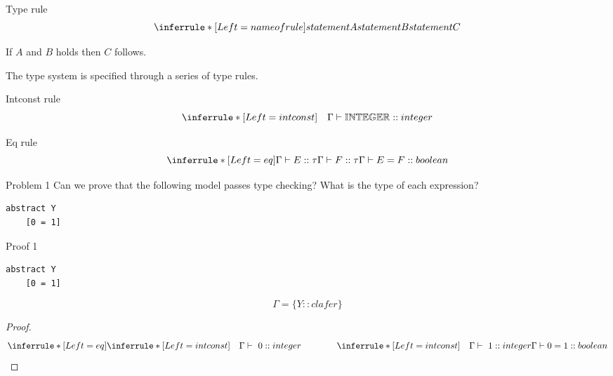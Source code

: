 \documentclass[table,15pt,t]{beamer}
\begin{document}
\begin{frame}[fragile,c]{Type rule}
\begin{equation*}
\inferrule* [Left=name of rule] {statement A \\ statement B} {statement C}
\end{equation*}

\vfill If $A$ and $B$ holds then $C$ follows.

\vfill The type system is specified through a series of type rules.
\end{frame}

\begin{frame}[fragile,c]{Intconst rule}
\begin{equation*}
\inferrule* [Left=intconst] {\quad}{\Gamma\vdash\mathbb{INTEGER}::integer}
\end{equation*}
\end{frame}

\begin{frame}[fragile,c]{Eq rule}
\begin{equation*}
\inferrule* [Left=eq] {\Gamma\vdash E::\tau \\ \Gamma\vdash F::\tau}{\Gamma\vdash E = F::boolean}
\end{equation*}
\end{frame}

\begin{frame}[fragile,c]{Problem 1}
Can we prove that the following model passes type checking?
What is the type of each expression?

\vfill \begin{lstlisting}
abstract Y
    [0 = 1]
\end{lstlisting}
\end{frame}

\begin{frame}[fragile,c]{Proof 1}
\begin{lstlisting}
abstract Y
    [0 = 1]
\end{lstlisting}

\begin{equation*}
\Gamma = \{Y::clafer\}
\end{equation*}

\begin{proof}
\begin{equation*}
\inferrule* [Left=eq] {
  \inferrule* [Left=intconst]{\quad}{\Gamma\vdash\ 0::integer} \\ \hspace{40pt} 
  \inferrule* [Left=intconst]{\quad}{\Gamma\vdash\ 1::integer}}
{\Gamma\vdash 0 = 1::boolean}
\end{equation*}
\end{proof}
\end{frame}
\end{document}
